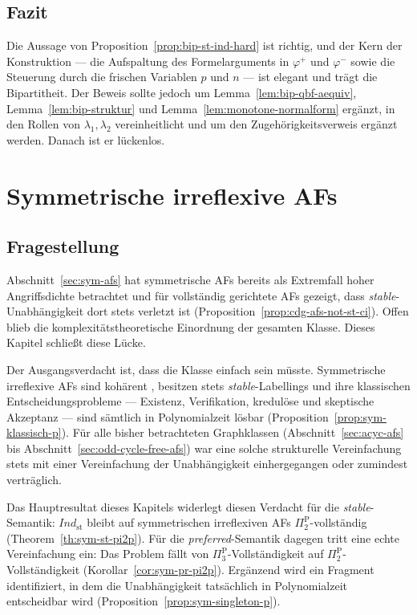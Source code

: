 \section{Fazit}
\label{sec:bip-analyse-fazit}

Die Aussage von Proposition~\ref{prop:bip-st-ind-hard} ist richtig, und der
Kern der Konstruktion --- die Aufspaltung des Formelarguments in \(\varphi^{+}\)
und \(\varphi^{-}\) sowie die Steuerung durch die frischen Variablen \(p\) und
\(n\) --- ist elegant und trägt die Bipartitheit. Der Beweis sollte jedoch um
Lemma~\ref{lem:bip-qbf-aequiv}, Lemma~\ref{lem:bip-struktur} und
Lemma~\ref{lem:monotone-normalform} ergänzt, in den Rollen von
\(\lambda_1,\lambda_2\) vereinheitlicht und um den Zugehörigkeitsverweis
ergänzt werden. Danach ist er lückenlos.

\chapter{Symmetrische irreflexive AFs}
\label{ch:sym-analyse}

\section{Fragestellung}
\label{sec:sym-frage}

Abschnitt~\ref{sec:sym-afs} hat symmetrische AFs bereits als Extremfall hoher
Angriffsdichte betrachtet und für vollständig gerichtete AFs gezeigt, dass
\textit{stable}-Unabhängigkeit dort stets verletzt ist
(Proposition~\ref{prop:cdg-afs-not-st-ci}). Offen blieb die
komplexitätstheoretische Einordnung der gesamten Klasse. Dieses Kapitel
schließt diese Lücke.

Der Ausgangsverdacht ist, dass die Klasse einfach sein müsste. Symmetrische
irreflexive AFs sind kohärent \cite{Coste:2005:symmetric-af-irflx-coherent},
besitzen stets \textit{stable}-Labellings und ihre klassischen
Entscheidungsprobleme --- Existenz, Verifikation, kredulöse und skeptische
Akzeptanz --- sind sämtlich in Polynomialzeit lösbar
(Proposition~\ref{prop:sym-klassisch-p}). Für alle bisher betrachteten
Graphklassen (Abschnitt~\ref{sec:acyc-afs} bis
Abschnitt~\ref{sec:odd-cycle-free-afs}) war eine solche strukturelle
Vereinfachung stets mit einer Vereinfachung der Unabhängigkeit einhergegangen
oder zumindest verträglich.

Das Hauptresultat dieses Kapitels widerlegt diesen Verdacht für die
\textit{stable}-Semantik: \(\textit{Ind}_{\mathrm{st}}\) bleibt auf
symmetrischen irreflexiven AFs \(\Pi_2^\text{P}\)-vollständig
(Theorem~\ref{th:sym-st-pi2p}). Für die \textit{preferred}-Semantik dagegen
tritt eine echte Vereinfachung ein: Das Problem fällt von
\(\Pi_3^\text{P}\)-Vollständigkeit auf \(\Pi_2^\text{P}\)-Vollständigkeit
(Korollar~\ref{cor:sym-pr-pi2p}). Ergänzend wird ein Fragment identifiziert, in
dem die Unabhängigkeit tatsächlich in Polynomialzeit entscheidbar wird
(Proposition~\ref{prop:sym-singleton-p}).

